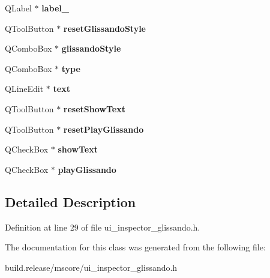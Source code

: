 \begin{DoxyCompactItemize}
Q\+Label $\ast$ {\bfseries label\+\_}
\item 
\mbox{\label{class_ui___inspector_glissando_ae581a92b2acdd9179bddae87bc3432de}} 
Q\+Tool\+Button $\ast$ {\bfseries reset\+Glissando\+Style}
\item 
\mbox{\label{class_ui___inspector_glissando_a5bf533e7a3eeaa878004be917cfcb074}} 
Q\+Combo\+Box $\ast$ {\bfseries glissando\+Style}
\item 
\mbox{\label{class_ui___inspector_glissando_a4f669db5eb5c2b48c250339a19fba30f}} 
Q\+Combo\+Box $\ast$ {\bfseries type}
\item 
\mbox{\label{class_ui___inspector_glissando_a541c6abf216e01a6268d391e44eeb360}} 
Q\+Line\+Edit $\ast$ {\bfseries text}
\item 
\mbox{\label{class_ui___inspector_glissando_a5212163ce86d0a6c1b8f5e2d0a8f29c8}} 
Q\+Tool\+Button $\ast$ {\bfseries reset\+Show\+Text}
\item 
\mbox{\label{class_ui___inspector_glissando_aece80cb44703f024ab6d5d6027a14f41}} 
Q\+Tool\+Button $\ast$ {\bfseries reset\+Play\+Glissando}
\item 
\mbox{\label{class_ui___inspector_glissando_abf00eac7798430ab7fa5e7e8b5171860}} 
Q\+Check\+Box $\ast$ {\bfseries show\+Text}
\item 
\mbox{\label{class_ui___inspector_glissando_a9ad21aa132592035273a1d44ecaa0f32}} 
Q\+Check\+Box $\ast$ {\bfseries play\+Glissando}
\end{DoxyCompactItemize}


\subsection{Detailed Description}


Definition at line 29 of file ui\+\_\+inspector\+\_\+glissando.\+h.



The documentation for this class was generated from the following file\+:\begin{DoxyCompactItemize}
\item 
build.\+release/mscore/ui\+\_\+inspector\+\_\+glissando.\+h\end{DoxyCompactItemize}
